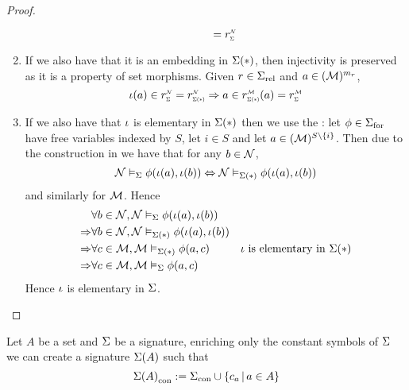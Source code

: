 \begin{proof}
\begin{enumerate}
\begin{itemize}
\[                        = \subintp{\Si}{\NN}{r}
                    \]
            \end{itemize}
        \item If we also have that it is an embedding in $\Sigma(*)$, 
            then injectivity is preserved as it is a property of set morphisms. 
            Given $r \in {\Sigma}_\mathrm{rel}$ and $a \in ({\mathcal{M}})^{m_r}$,
            \[
                \io(a)  \in \subintp{\Si}{\NN}{r}
                = \subintp{\Si(*)}{\NN}{r}
                \implies 
                a \in \subintp{\Si(*)}{\MM}{r}(a)
                = \subintp{\Si}{\MM}{r}
            \]
        \item If we also have that $\iota$ is elementary in $\Sigma(*)$ 
            then we use the :
            let $\phi \in {\Sigma}_\mathrm{for}$ have free variables indexed by $S$,
            let $i \in S$ 
            and let $a \in ({\mathcal{M}})^{S \setminus \left\{i\right\}}$.
            Then due to the construction in
            we have that for any $b \in {\mathcal{N}}$, 
            \[\mathcal{N} \vDash_{\Sigma} \phi (\iota(a),\iota(b)) 
            \Leftrightarrow \mathcal{N} \vDash_{\Sigma(*)} \phi (\iota(a),\iota(b))\]
            and similarly for $\mathcal{M}$.
            Hence 
            \begin{align*}
                &\forall b \in {\mathcal{N}}, 
                \mathcal{N} \vDash_{\Sigma} \phi(\iota(a),\iota(b)) \\
                \Rightarrow &\forall b \in {\mathcal{N}}, 
                \mathcal{N} \vDash_{\Sigma(*)} \phi(\iota(a),\iota(b)) \\
                \Rightarrow &\forall c \in {\mathcal{M}}, 
                \mathcal{M} \vDash_{\Sigma(*)} \phi(a,c) 
                & \text{$\iota$ is elementary in $\Sigma(*)$}\\
                \Rightarrow &\forall c \in {\mathcal{M}}, \mathcal{M} \vDash_{\Sigma} \phi(a,c)
            \end{align*}
            Hence $\iota$ is elementary in $\Sigma$.
    \end{enumerate}
\end{proof}

\begin{nttn}
    Let $A$ be a set and $\Sigma$ be a signature,
    enriching only the constant symbols of $\Sigma$ we can create a signature 
    $\Sigma(A)$ such that 
    \[
        {\Sigma(A)}_\mathrm{con} := 
        {\Sigma}_\mathrm{con} \cup \left\{c_a \,|\, a \in A\right\}
    \]
\end{nttn}

